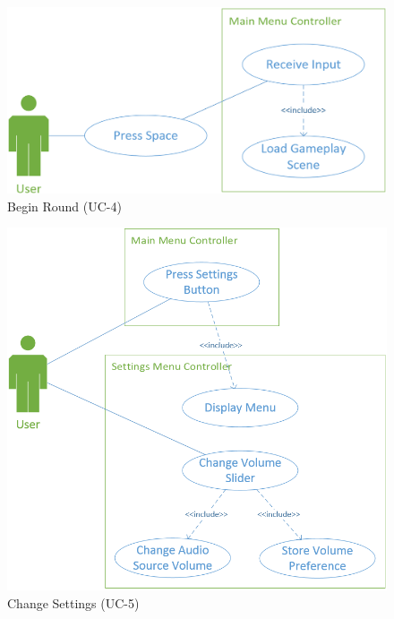 \documentclass[12pt]{report}
\begin{document}
	\begin{figure}
		\centering
		\includegraphics[scale=0.5]{images/BeginRound.png}
		\caption{Begin Round (UC-4)}
	\end{figure}
	\begin{figure}
		\centering
		\includegraphics[scale=0.5]{images/ChangeSettings.png}
		\caption{Change Settings (UC-5)}
	\end{figure}
\end{document}
